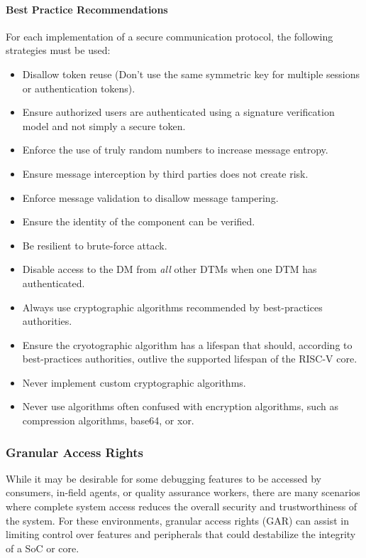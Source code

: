 \paragraph{Best Practice Recommendations}
For each implementation of a secure communication protocol, the following strategies must be used:
\begin{itemize}
    \item Disallow token reuse (Don't use the same symmetric key for multiple sessions or authentication tokens).
    \item Ensure authorized users are authenticated using a signature verification model and not simply a secure token.
    \item Enforce the use of truly random numbers to increase message entropy.
    \item Ensure message interception by third parties does not create risk.
    \item Enforce message validation to disallow message tampering.
    \item Ensure the identity of the component can be verified.
    \item Be resilient to brute-force attack.
    \item Disable access to the DM from {\em all} other DTMs when one DTM has authenticated.
    \item Always use cryptographic algorithms recommended by best-practices authorities.
    \item Ensure the cryotographic algorithm has a lifespan that should, according to best-practices authorities, outlive the supported lifespan of the RISC-V core.
    \item Never implement custom cryptographic algorithms.
    \item Never use algorithms often confused with encryption algorithms, such as compression algorithms, base64, or xor.
\end{itemize}

\subsubsection{Granular Access Rights}
While it may be desirable for some debugging features to be accessed by consumers, in-field agents, or quality assurance workers, there are many scenarios where complete system access reduces the overall security and trustworthiness of the system. For these environments, granular access rights (GAR) can assist in limiting control over features and peripherals that could destabilize the integrity of a SoC or core. 

